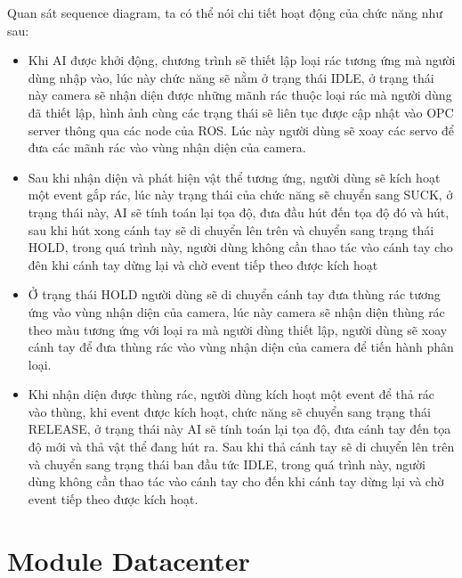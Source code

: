 Quan sát sequence diagram, ta có thể nói chi tiết hoạt động của chức năng như sau:
\begin{itemize}
    \item Khi AI được khởi động, chương trình sẽ thiết lập loại rác tương ứng mà người dùng nhập vào, lúc này chức năng sẽ nằm ở trạng thái IDLE, ở trạng thái này camera sẽ nhận diện được những mãnh rác thuộc loại rác mà người dùng đã thiết lập, hình ảnh cùng các trạng thái sẽ liên tục được cập nhật vào OPC server thông qua các node của ROS.
    Lúc này người dùng sẽ xoay các servo để đưa các mãnh rác vào vùng nhận diện của camera.
    \item Sau khi nhận diện và phát hiện vật thể tương ứng, người dùng sẽ kích hoạt một event gắp rác, lúc này trạng thái của chức năng sẽ chuyển sang SUCK, ở trạng thái này, AI sẽ tính toán lại tọa độ, đưa đầu hút đến tọa độ đó và hút, sau khi hút xong cánh tay sẽ di chuyển lên trên và chuyển sang trạng thái HOLD, trong quá trình này, người dùng không cần thao tác vào cánh tay cho đên khi cánh tay dừng lại và chờ event tiếp theo được kích hoạt
    \item Ở trạng thái HOLD người dùng sẽ di chuyển cánh tay đưa thùng rác tương ứng vào vùng nhận diện của camera, lúc này camera sẽ nhận diện thùng rác theo màu tương ứng với loại ra mà người dùng thiết lập, người dùng sẽ xoay cánh tay để đưa thùng rác vào vùng nhận diện của camera để tiến hành phân loại.
    \item  Khi nhận diện được thùng rác, người dùng kích hoạt một event để thả rác vào thùng, khi event được kích hoạt, chức năng sẽ chuyển sang trạng thái RELEASE, ở trạng thái này AI sẽ tính toán lại tọa độ, đưa cánh tay đến tọa độ mới và thả vật thể đang hút ra. Sau khi thả cánh tay sẽ di chuyển lên trên và chuyển sang trạng thái ban đầu tức IDLE, trong quá trình này, người dùng không cần thao tác vào cánh tay cho đến khi cánh tay dừng lại và chờ event tiếp theo được kích hoạt.
\end{itemize}
 
\section{Module Datacenter}


